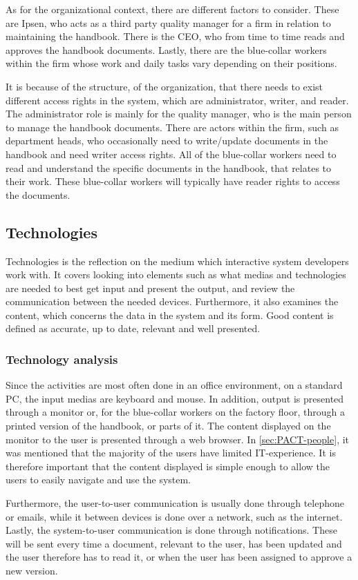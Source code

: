 As for the organizational context, there are different factors to consider.
These are Ipsen, who acts as a third party quality manager for a firm in relation to maintaining the handbook.
There is the CEO, who from time to time reads and approves the handbook documents.
Lastly, there are the blue-collar workers within the firm whose work and daily tasks vary depending on their positions.

It is because of the structure, of the organization, that there needs to exist different access rights in the system, which are administrator, writer, and reader.
The administrator role is mainly for the quality manager, who is the main person to manage the handbook documents.
There are actors within the firm, such as department heads, who occasionally need to write/update documents in the handbook and need writer access rights.
All of the blue-collar workers need to read and understand the specific documents in the handbook, that relates to their work.
These blue-collar workers will typically have reader rights to access the documents.
\subsection{Technologies}
Technologies is the reflection on the medium which interactive system developers work with.
It covers looking into elements such as what medias and technologies are needed to best get input and present the output, and review the communication between the needed devices.
Furthermore, it also examines the content, which concerns the data in the system and its form.
Good content is defined as accurate, up to date, relevant and well presented.

\subsubsection*{Technology analysis}
Since the activities are most often done in an office environment, on a standard PC, the input medias are keyboard and mouse.
In addition, output is presented through a monitor or, for the blue-collar workers on the factory floor, through a printed version of the handbook, or parts of it.
The content displayed on the monitor to the user is presented through a web browser.
In \cref{sec:PACT-people}, it was mentioned that the majority of the users have limited IT-experience.
It is therefore important that the content displayed is simple enough to allow the users to easily navigate and use the system.

Furthermore, the user-to-user communication is usually done through telephone or emails, while it between devices is done over a network, such as the internet.
Lastly, the system-to-user communication is done through notifications.
These will be sent every time a document, relevant to the user, has been updated and the user therefore has to read it, or when the user has been assigned to approve a new version.
